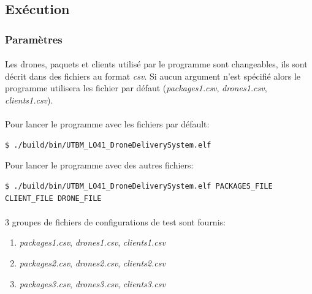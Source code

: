 \documentclass[article, backcover, french, nodocumentinfo]{upmethodology-document}
\begin{document}
		\subsection{Exécution}
			\subsubsection{Paramètres}
				\paragraph*{}
					Les drones, paquets et clients utilisé par le programme sont changeables, ils sont décrit dans des fichiers au format \textit{csv}. Si aucun argument n'est spécifié alors le programme utilisera les fichier par défaut (\textit{packages1.csv}, \textit{drones1.csv}, \textit{clients1.csv}).
				\paragraph*{}
					Pour lancer le programme avec les fichiers par défault:
					\begin{lstlisting}[breaklines=true,breakatwhitespace=true,breakindent=0pt,columns=fixed,keepspaces=true,frame=single,basicstyle=\footnotesize\sffamily]
$ ./build/bin/UTBM_LO41_DroneDeliverySystem.elf\end{lstlisting}
					Pour lancer le programme avec des autres fichiers:
					\begin{lstlisting}[breaklines=true,breakatwhitespace=true,breakindent=0pt,columns=fixed,keepspaces=true,frame=single,basicstyle=\footnotesize\sffamily]
$ ./build/bin/UTBM_LO41_DroneDeliverySystem.elf PACKAGES_FILE CLIENT_FILE DRONE_FILE\end{lstlisting}
				\paragraph*{}
					3 groupes de fichiers de configurations de test sont fournis:
					\begin{enumerate}
						\item \textit{packages1.csv}, \textit{drones1.csv}, \textit{clients1.csv}
						\item \textit{packages2.csv}, \textit{drones2.csv}, \textit{clients2.csv}
						\item \textit{packages3.csv}, \textit{drones3.csv}, \textit{clients3.csv}
					\end{enumerate}
\end{document}
